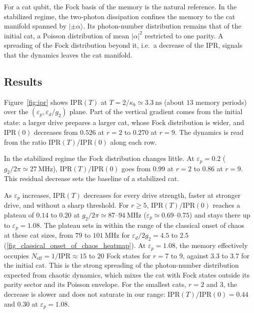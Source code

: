 \documentclass[aps,prx,reprint,floatfix,amsmath,amssymb,longbibliography]{revtex4-2}
\begin{document}
For a cat qubit, the Fock basis of the memory is the natural reference. In the
stabilized regime, the two-photon dissipation confines the memory to the cat
manifold spanned by $|\pm\alpha\rangle$. Its photon-number distribution
remains that of the initial cat, a Poisson distribution of mean $|\alpha|^2$
restricted to one parity. A spreading of the Fock distribution beyond it,
i.e.\ a decrease of the IPR, signals that the dynamics leaves the cat
manifold.

\subsection{Results}

Figure~\ref{fig:ipr} shows $\mathrm{IPR}(T)$ at $T=2/\kappa_b\simeq3.3~\mathrm{ns}$ (about $13$ memory periods) over the
$(\varepsilon_p, \varepsilon_d/g_2)$ plane. Part of the vertical gradient
comes from the initial state: a larger drive prepares a larger cat, whose
Fock distribution is wider, and $\mathrm{IPR}(0)$ decreases from $0.526$ at
$r = 2$ to $0.270$ at $r = 9$. The dynamics is read from the ratio
$\mathrm{IPR}(T)/\mathrm{IPR}(0)$ along each row.

In the stabilized regime the Fock distribution changes little. At
$\varepsilon_p = 0.2$ ($g_2/2\pi\simeq27~\mathrm{MHz}$),
$\mathrm{IPR}(T)/\mathrm{IPR}(0)$ goes from $0.99$ at $r=2$ to $0.86$ at
$r=9$. This residual decrease sets the baseline of a stabilized cat.

As $\varepsilon_p$ increases, $\mathrm{IPR}(T)$ decreases for every drive
strength, faster at stronger drive, and without a sharp threshold. For
$r \geq 5$, $\mathrm{IPR}(T)/\mathrm{IPR}(0)$ reaches a plateau of $0.14$ to
$0.20$ at $g_2/2\pi\simeq87$--$94~\mathrm{MHz}$ ($\varepsilon_p\simeq0.69$--$0.75$)
and stays there up to $\varepsilon_p=1.08$. The plateau sets in within the range
of the classical onset of chaos at these cat sizes, from $79$ to
$101~\mathrm{MHz}$ for $\varepsilon_d/2g_2=4.5$ to $2.5$
(\cref{fig_classical_onset_of_chaos_heatmap}). At $\varepsilon_p = 1.08$, the
memory effectively occupies $N_\mathrm{eff} = 1/\mathrm{IPR} \approx 15$ to
$20$ Fock states for $r=7$ to $9$, against $3.3$ to $3.7$ for the initial cat.
This is the strong spreading of the photon-number distribution expected from
chaotic dynamics, which mixes the cat with Fock states outside its parity
sector and its Poisson envelope. For the smallest cats, $r=2$ and $3$, the
decrease is slower and does not saturate in our range:
$\mathrm{IPR}(T)/\mathrm{IPR}(0)=0.44$ and $0.30$ at $\varepsilon_p=1.08$.
\end{document}
